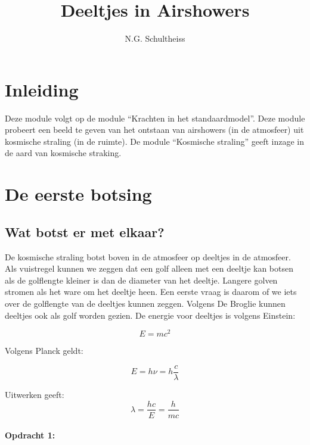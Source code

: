 



\title{Deeltjes in Airshowers}
\author{N.G. Schultheiss}
\date{}

\maketitle
\thispagestyle{firststyle}

\section{Inleiding}

Deze module volgt op de module ``Krachten in het standaardmodel''.
Deze module probeert een beeld te geven van het ontstaan van airshowers
(in de atmosfeer) uit kosmische straling (in de ruimte). De module
``Kosmische straling'' geeft inzage in de aard van kosmische straking.


\section{De eerste botsing}


\subsection{Wat botst er met elkaar?}

De kosmische straling botst boven in de atmosfeer op deeltjes in de
atmosfeer. Als vuistregel kunnen we zeggen dat een golf alleen met
een deeltje kan botsen als de golflengte kleiner is dan de diameter
van het deeltje. Langere golven stromen als het ware om het deeltje
heen. Een eerste vraag is daarom of we iets over de golflengte van
de deeltjes kunnen zeggen. Volgens De Broglie kunnen deeltjes ook
als golf worden gezien. De energie voor deeltjes is volgens Einstein:

\begin{equation}
E=mc^{2}
\end{equation}


Volgens Planck geldt:

\begin{equation}
E=h\nu=h\frac{c}{\lambda}
\end{equation}


Uitwerken geeft:
\begin{equation}
\lambda=\frac{hc}{E}=\frac{h}{mc}
\end{equation}


\paragraph*{Opdracht 1:}

